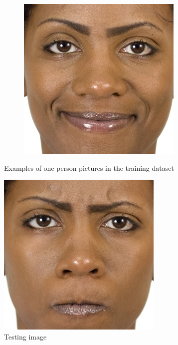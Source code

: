 \begin{figure}[H]
\begin{subfigure}[b]{.2\linewidth}
\end{subfigure}
\centering
\begin{subfigure}[b]{.2\linewidth}
\includegraphics[width=\linewidth]{img/CFD3.jpg}
\end{subfigure}
\caption{Examples of one person pictures in the training dataset}
\end{figure}


\begin{figure}[H]
\centering
\includegraphics[scale=0.3]{img/CFD4.jpg}
\caption{Testing image}
\end{figure} 


